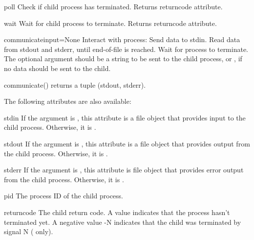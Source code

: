 \begin{methoddesc}[Popen]{poll}{}
Check if child process has terminated.  Returns returncode
attribute.
\end{methoddesc}

\begin{methoddesc}[Popen]{wait}{}
Wait for child process to terminate.  Returns returncode attribute.
\end{methoddesc}

\begin{methoddesc}[Popen]{communicate}{input=None}
Interact with process: Send data to stdin.  Read data from stdout and
stderr, until end-of-file is reached.  Wait for process to terminate.
The optional  argument should be a string to be sent to the
child process, or , if no data should be sent to the child.

communicate() returns a tuple (stdout, stderr).

\end{methoddesc}

The following attributes are also available:

\begin{memberdesc}[Popen]{stdin}
If the  argument is , this attribute is a file
object that provides input to the child process.  Otherwise, it is
.
\end{memberdesc}

\begin{memberdesc}[Popen]{stdout}
If the  argument is , this attribute is a file
object that provides output from the child process.  Otherwise, it is
.
\end{memberdesc}

\begin{memberdesc}[Popen]{stderr}
If the  argument is , this attribute is file
object that provides error output from the child process.  Otherwise,
it is .
\end{memberdesc}

\begin{memberdesc}[Popen]{pid}
The process ID of the child process.
\end{memberdesc}

\begin{memberdesc}[Popen]{returncode}
The child return code.  A  value indicates that the process
hasn't terminated yet.  A negative value -N indicates that the child
was terminated by signal N (\UNIX{} only).
\end{memberdesc}


